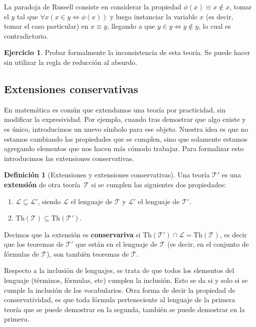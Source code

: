 \documentclass[a4paper, 12pt]{report}
\newcommand{\te}{\text}
\newcommand{\Lra}{\Leftrightarrow}
\theoremstyle{definition}
\newtheorem{definicion}[teorema]{Definición}
\newtheorem{ejercicio}{Ejercicio}[section]
\begin{document}
La paradoja de Russell consiste en considerar la propiedad $\phi(x)\equiv x\not\in x$, tomar el $y$ tal que $\forall x(x\in y\Lra \phi(x))$ y luego instanciar la variable $x$ (es decir, tomar el caso particular) en $x\equiv y$, llegando a que $y\in y\Lra y\not\in y$, lo cual es contradictorio.

\begin{ejercicio}
	Probar formalmente la inconsistencia de esta teoría. Se puede hacer sin utilizar la regla de reducción al absurdo.
\end{ejercicio} 

\subsection{Extensiones conservativas}

En matemática es común que extendamos una teoría por practicidad, sin modificar la expresividad. Por ejemplo, cuando tras demostrar que algo existe y es único, introducimos un nuevo símbolo para ese objeto. Nuestra idea es que no estamos cambiando las propiedades que se cumplen, sino que solamente estamos agregando elementos que nos hacen más cómodo trabajar. Para formalizar esto introducimos las extensiones conservativas.

\begin{definicion}[Extensiones y extensiones conservativas]
	Una teoría $\mathcal{T}'$ es una \textbf{extensión} de otra teoría~$\mathcal{T}$ si se cumplen las siguientes dos propiedades:
	\begin{enumerate}
		\item $\mathcal{L}\subseteq\mathcal{L}'$, siendo $\mathcal{L}$ el lenguaje de $\mathcal{T}$ y $\mathcal{L}'$ el lenguaje de $\mathcal{T}'$.
		\item $\te{Th}(\mathcal{T})\subseteq\te{Th}(\mathcal{T}')$.
	\end{enumerate}
	Decimos que la extensión es \textbf{conservariva} si $\te{Th}(\mathcal{T}')\cap\mathcal{L}=\te{Th}(\mathcal{T})$, es decir que los teoremas de $\mathcal{T}'$ que están en el lenguaje de $\mathcal{T}$ (es decir, en el conjunto de fórmulas de $\mathcal{T}$), son también teoremas de $\mathcal{T}$.
\end{definicion}
Respecto a la inclusión de lenguajes, se trata de que todos los elementos del lenguaje (términos, fórmulas, etc) cumplen la inclusión. Esto se da si y solo si se cumple la inclusión de los vocabularios. Otra forma de decir la propiedad de conservatividad, es que toda fórmula perteneciente al lenguaje de la primera teoría que se puede demostrar en la segunda, también se puede demostrar en la primera.
\end{document}
